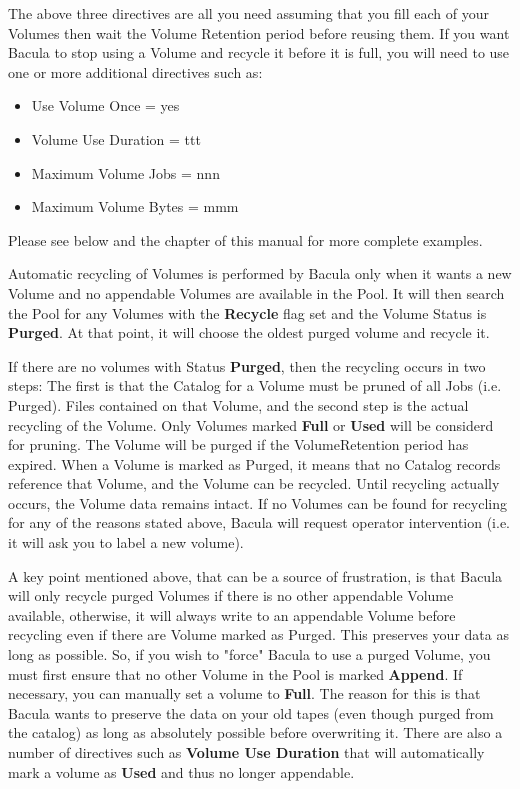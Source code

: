 The above three directives are all you need assuming that you fill
each of your Volumes then wait the Volume Retention period before 
reusing them.  If you want Bacula to stop using a Volume and recycle
it before it is full, you will need to use one or more additional 
directives such as:
\begin{itemize}
\item Use Volume Once = yes
\item Volume Use Duration = ttt
\item Maximum Volume Jobs = nnn
\item Maximum Volume Bytes = mmm
\end{itemize}
Please see below and 
the  chapter
of this manual for more complete examples.  

Automatic recycling of Volumes is performed by Bacula only when it wants a
new Volume and no appendable Volumes are available in the Pool. It will then
search the Pool for any Volumes with the {\bf Recycle} flag set and the 
Volume Status is {\bf Purged}. At that point, it will choose the oldest 
purged volume and recycle it.

If there are no volumes with Status {\bf Purged}, then 
the recycling occurs in two steps:
The first is that the Catalog for a Volume must be pruned of all Jobs (i.e.
Purged).  Files contained on that Volume, and the second step is the actual
recycling of the Volume.  Only Volumes marked {\bf Full} or {\bf Used} will
be considerd for pruning.  The Volume will be purged if the VolumeRetention
period has expired.  When a Volume is marked as Purged, it means that no
Catalog records reference that Volume, and the Volume can be recycled.
Until recycling actually occurs, the Volume data remains intact.  If no
Volumes can be found for recycling for any of the reasons stated above,
Bacula will request operator intervention (i.e.  it will ask you to label a
new volume).

A key point mentioned above, that can be a source of frustration, is that Bacula
will only recycle purged Volumes if there is no other appendable Volume
available, otherwise, it will always write to an appendable Volume before
recycling even if there are Volume marked as Purged. This preserves your data
as long as possible. So, if you wish to "force" Bacula to use a purged
Volume, you must first ensure that no other Volume in the Pool is marked {\bf
Append}. If necessary, you can manually set a volume to {\bf Full}. The reason
for this is that Bacula wants to preserve the data on your old tapes (even
though purged from the catalog) as long as absolutely possible before
overwriting it. There are also a number of directives such as
{\bf Volume Use Duration} that will automatically mark a volume as {\bf
Used} and thus no longer appendable.

